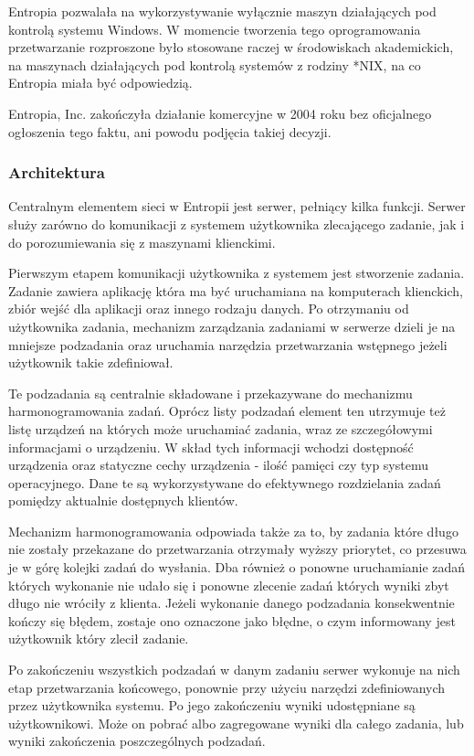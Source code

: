 \documentclass[12pt,a4paper,twoside]{article}
\begin{document}
Entropia pozwalała na wykorzystywanie wyłącznie maszyn działających pod kontrolą systemu Windows. W momencie tworzenia tego oprogramowania przetwarzanie rozproszone było stosowane raczej w środowiskach akademickich, na maszynach działających pod kontrolą systemów z rodziny *NIX, na co Entropia miała być odpowiedzią.

Entropia, Inc. zakończyła działanie komercyjne w 2004 roku bez oficjalnego ogłoszenia tego faktu, ani powodu podjęcia takiej decyzji.

\subsubsection{Architektura}

Centralnym elementem sieci w Entropii jest serwer, pełniący kilka funkcji. Serwer służy zarówno do komunikacji z systemem użytkownika zlecającego zadanie, jak i do porozumiewania się z maszynami klienckimi.

Pierwszym etapem komunikacji użytkownika z systemem jest stworzenie zadania. Zadanie zawiera aplikację która ma być uruchamiana na komputerach klienckich, zbiór wejść dla aplikacji oraz innego rodzaju danych. Po otrzymaniu od użytkownika zadania, mechanizm zarządzania zadaniami w serwerze dzieli je na mniejsze podzadania oraz uruchamia narzędzia przetwarzania wstępnego jeżeli użytkownik takie zdefiniował. 

Te podzadania są centralnie składowane i przekazywane do mechanizmu harmonogramowania zadań. Oprócz listy podzadań element ten utrzymuje też listę urządzeń na których może uruchamiać zadania, wraz ze szczegółowymi informacjami o urządzeniu. W skład tych informacji wchodzi dostępność urządzenia oraz statyczne cechy urządzenia - ilość pamięci czy typ systemu operacyjnego. Dane te są wykorzystywane do efektywnego rozdzielania zadań pomiędzy aktualnie dostępnych klientów.

Mechanizm harmonogramowania odpowiada także za to, by zadania które długo nie zostały przekazane do przetwarzania otrzymały wyższy priorytet, co przesuwa je w górę kolejki zadań do wysłania. Dba również o ponowne uruchamianie zadań których wykonanie nie udało się i ponowne zlecenie zadań których wyniki zbyt długo nie wróciły z klienta. Jeżeli wykonanie danego podzadania konsekwentnie kończy się błędem, zostaje ono oznaczone jako błędne, o czym informowany jest użytkownik który zlecił zadanie.

Po zakończeniu wszystkich podzadań w danym zadaniu serwer wykonuje na nich etap przetwarzania końcowego, ponownie przy użyciu narzędzi zdefiniowanych przez użytkownika systemu. Po jego zakończeniu wyniki udostępniane są użytkownikowi. Może on pobrać albo zagregowane wyniki dla całego zadania, lub wyniki zakończenia poszczególnych podzadań.
\end{document}
